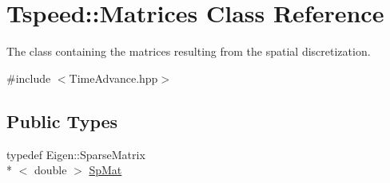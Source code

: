 \hypertarget{classTspeed_1_1Matrices}{\section{Tspeed\-:\-:Matrices Class Reference}
\label{classTspeed_1_1Matrices}
}


The class containing the matrices resulting from the spatial discretization.  




{\ttfamily \#include $<$Time\-Advance.\-hpp$>$}

\subsection*{Public Types}
\begin{DoxyCompactItemize}
\item 
typedef Eigen\-::\-Sparse\-Matrix\\*
$<$ double $>$ \hyperlink{classTspeed_1_1Matrices_aec4249f1ac32c3249adae9c91bac1cbf}{Sp\-Mat}
\end{DoxyCompactItemize}
